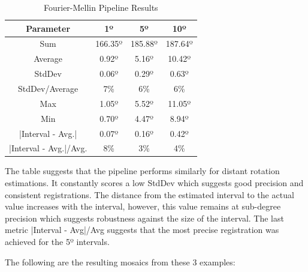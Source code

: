 \begin{table}[H]
    \centering
    \begin{tabular}{|c|c|c|c|}
        \hline
        \textbf{Parameter} & \textbf{1º} & \textbf{5º} & \textbf{10º} \\ \hline
        Sum & 166.35º & 185.88º & 187.64º \\ \hline
        Average & 0.92º & 5.16º & 10.42º \\ \hline
        StdDev & 0.06º & 0.29º & 0.63º \\ \hline
        StdDev/Average & 7\% & 6\% & 6\% \\ \hline
        Max & 1.05º & 5.52º & 11.05º \\ \hline
        Min & 0.70º & 4.47º & 8.94º \\ \hline
        |Interval - Avg.| & 0.07º & 0.16º & 0.42º \\ \hline
        |Interval - Avg.|/Avg. & 8\% & 3\% & 4\% \\ \hline
    \end{tabular}
    \caption{Fourier-Mellin Pipeline Results}
\end{table}

The table suggests that the pipeline performs similarly for distant rotation estimations. It constantly scores a low StdDev which suggests good precision and consistent registrations. The distance from the estimated interval to the actual value increases with the interval, however, this value remains at sub-degree precision which suggests robustness against the size of the interval. The last metric |Interval - Avg|/Avg suggests that the most precise registration was achieved for the 5º intervals.

The following are the resulting mosaics from these 3 examples:

